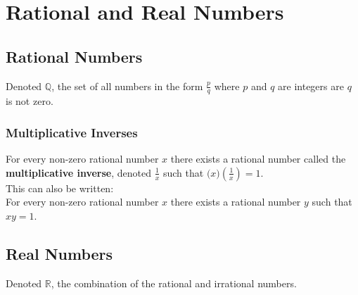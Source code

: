 \documentclass[../notes.tex]{subfiles}
\begin{document}
	\chapter{Rational and Real Numbers}
		\section{Rational Numbers}
			Denoted $\mathbb{Q}$, the set of all numbers in the form $\frac{p}{q}$ where $p$ and $q$ are integers are $q$ is not zero.
			\subsection{Multiplicative Inverses}
				For every non-zero rational number $x$ there exists a rational number called the \textbf{multiplicative inverse}, denoted $\frac{1}{x}$ such that $\bigl(x\bigr)\left(\frac{1}{x}\right) = 1$.\\
				This can also be written:\\
				\-\hspace{2em}For every non-zero rational number $x$ there exists a rational number $y$ such that $xy = 1$.
		\section{Real Numbers}
			Denoted $\mathbb{R}$, the combination of the rational and irrational numbers.
\end{document}
